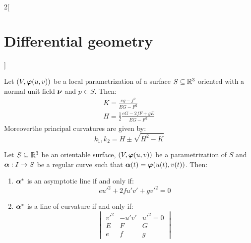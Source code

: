 \documentclass[../../../main.tex]{subfiles}
\begin{document}
\begin{multicols}{2}[\section{Differential geometry}]
\begin{proposition}
  \end{proposition}
  \begin{corollary}
    Let $(V,\boldsymbol{\mathrm{\varphi}}(u,v))$ be a local parametrization of a surface $S\subseteq\mathbb{R}^3$ oriented with a normal unit field $\boldsymbol{\mathrm{\nu}}$ and $p\in S$. Then:
    \begin{gather*}
      K =\frac{eg-f^2}{EG-F^2}               \\
      H =\frac{1}{2}\frac{eG-2fF+gE}{EG-F^2}
    \end{gather*}
    Moreoverthe principal curvatures are given by: $$k_1,k_2=H\pm\sqrt{H^2-K}$$
  \end{corollary}
  \begin{proposition}
    Let $S\subseteq\mathbb{R}^3$ be an orientable surface, $(V,\boldsymbol{\mathrm{\varphi}}(u,v))$ be a parametrization of $S$ and $\boldsymbol{\mathrm{\alpha}}:I\rightarrow S$ be a regular curve such that $\boldsymbol{\mathrm{\alpha}}(t)=\boldsymbol{\mathrm{\varphi}}(u(t),v(t))$. Then:
    \begin{enumerate}
      \item $\boldsymbol{\mathrm{\alpha}}^*$ is an asymptotic line if and only if: $$e{u'}^2+2fu'v'+g{v'}^2=0$$
      \item $\boldsymbol{\mathrm{\alpha}}^*$ is a line of curvature if and only if:
            $$
              \begin{vmatrix}
                {v'}^2 & -u'v' & {u'}^2=0 \\
                E      & F     & G        \\
                e      & f     & g
              \end{vmatrix}
            $$
    \end{enumerate}
  \end{proposition}

\end{multicols}
\end{document}
